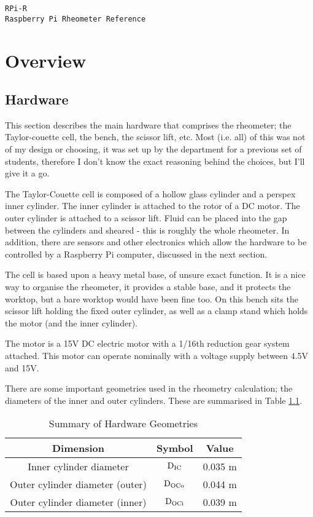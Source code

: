 \documentclass{report}
\begin{document}
	
	{
		\centering
		\vfill
		\Huge \texttt{RPi-R} \\
		\Large \texttt{Raspberry Pi Rheometer Reference}
		\vfill
		\newpage
	}
	
	\tableofcontents
	
	\chapter{Overview}
	
		
		\section{Hardware}
			This section describes the main hardware that comprises the rheometer; the Taylor-couette cell, the bench, the scissor lift, etc. Most (i.e. all) of this was not of my design or choosing, it was set up by the department for a previous set of students, therefore I don't know the exact reasoning behind the choices, but I'll give it a go.
			
			The Taylor-Couette cell is composed of a hollow glass cylinder and a perspex inner cylinder. The inner cylinder is attached to the rotor of a DC motor. The outer cylinder is attached to a scissor lift. Fluid can be placed into the gap between the cylinders and sheared - this is roughly the whole rheometer. In addition, there are sensors and other electronics which allow the hardware to be controlled by a Raspberry Pi computer, discussed in the next section.
			
			The cell is based upon a heavy metal base, of unsure exact function. It is a nice way to organise the rheometer, it provides a stable base, and it protects the worktop, but a bare worktop would have been fine too. On this bench sits the scissor lift holding the fixed outer cylinder, as well as a clamp stand which holds the motor (and the inner cylinder).
			
			The motor is a 15V DC electric motor with a 1/16th reduction gear system attached. This motor can operate nominally with a voltage supply between 4.5V and 15V.
			
			There are some important geometries used in the rheometry calculation; the diameters of the inner and outer cylinders. These are summarised in Table \ref{tablegeoms}.
			
			\begin{table}
				\centering
				\caption{Summary of Hardware Geometries}
				\label{tablegeoms}
				\begin{tabular}{| c | c | c |}
					\hline
					\textbf{Dimension} & \textbf{Symbol} & \textbf{Value} \\ \hline
					Inner cylinder diameter & $\rm D_{IC}$ & 0.035 m \\ \hline
					Outer cylinder diameter (outer) & $\rm D_{OCo}$ & 0.044 m \\ \hline
					Outer cylinder diameter (inner) & $\rm D_{OCi}$ & 0.039 m \\ \hline
				\end{tabular}
			\end{table}
			
\end{document}
